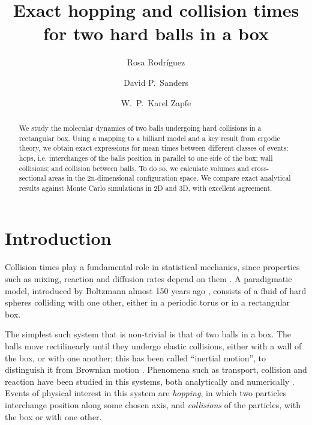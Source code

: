 \documentclass[superscriptaddress,pre,reprint,showpacs,twocolumn]{revtex4-1}
\begin{document}
\title{Exact hopping and collision times for two hard balls in a box}

\author{Rosa Rodríguez}

\author{David P.~Sanders}

\author{W.~P.~Karel Zapfe}



\begin{abstract}
We study the molecular dynamics of two balls undergoing hard collisions in a rectangular box.
Using a mapping to a billiard model and a key result from ergodic theory, we obtain exact expressions for mean times between different classes of events:
hops, i.e. interchanges of the balls position in parallel to one side of the box;
wall collisions; and collision between balls.
To do so, we calculate
volumes and cross-sectional areas in the 2n-dimensional configuration space.
We compare exact analytical results against Monte Carlo simulations in 2D and 3D,
with excellent agreement.
\end{abstract}

\maketitle


\section{Introduction}


Collision times play a fundamental role in statistical mechanics, since properties
such as mixing, reaction and diffusion rates depend on them \cite{Boltz72, Tolman, VanKampen}.
A paradigmatic model, introduced by Boltzmann almost 150 years ago \cite{Boltz72, SzaszBook00},
consists of a fluid of hard spheres colliding with one other, either in a periodic torus or in
a rectangular box.

The simplest such system that is non-trivial is that of two balls in a box.
The balls move rectilinearly until they undergo
elastic collisions, either with a wall of the box, or with one another; this has been called ``inertial motion'', to distinguish it from Brownian motion \cite{Bowles04}.
Phenomena such as transport, collision and reaction
have been studied in this systems, both analytically 
 \cite{Awazu01, Munakata02, Suh05} and numerically \cite{MacElroy2004, MacElroy2005}.
 Events of physical interest in this system are \emph{hopping},
in which two particles interchange position along some chosen axis,
and \emph{collisions} of the particles, with the box or with one other.
\end{document}
